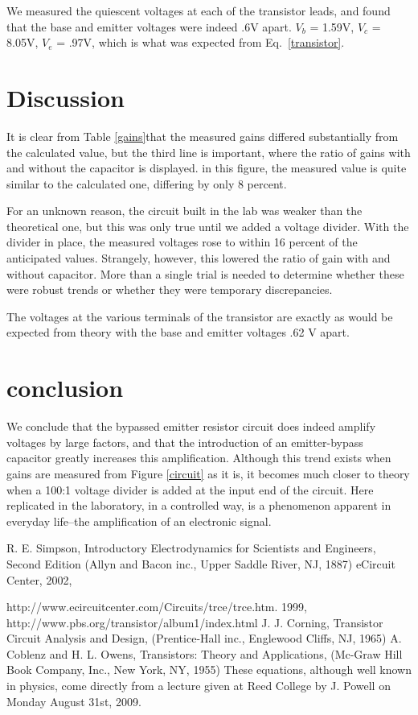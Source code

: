\documentclass[aps,pre,twocolumn,nofootinbib]{revtex4}
\begin{document}
We measured the quiescent voltages at each of the transistor leads, and found that the base and emitter voltages were indeed .6V apart.  $V_b$ = 1.59V, $V_c$ = 8.05V, $V_e$ = .97V, which is what was expected from Eq.~\ref{transistor}.

\section{Discussion}

It is clear from Table \ref{gains}that the measured gains differed substantially from the calculated value, but the third line is important, where the ratio of gains with and without the capacitor is displayed.  in this figure, the measured value is quite similar to the calculated one, differing by only 8 percent.  

For an unknown reason, the circuit built in the lab was weaker than the theoretical one, but this was only true until we added a voltage divider.  With the divider in place, the measured voltages rose to within 16 percent of the anticipated values.  Strangely, however, this lowered the ratio of gain with and without capacitor.  More than a single trial is needed to determine whether these were robust trends or whether they were temporary discrepancies.  

The voltages at the various terminals of the transistor are exactly as would be expected from theory with the base and emitter voltages .62 V apart.  

\section{conclusion}  
We conclude that the bypassed emitter resistor circuit does indeed amplify voltages by large factors, and that the introduction of an emitter-bypass capacitor greatly increases this amplification.  Although this trend exists when gains are measured from Figure \ref{circuit} as it is, it becomes much closer to theory when a 100:1 voltage divider is added at the input end of the circuit.  Here replicated in the laboratory, in a controlled way, is a phenomenon apparent in everyday life--the amplification of an electronic signal.  

	\begin{thebibliography}{99,onecolumn}
 R. E. Simpson, Introductory Electrodynamics for Scientists and Engineers, Second Edition (Allyn and Bacon inc., Upper Saddle River, NJ, 1887)
 eCircuit Center, 2002, 

http://www.ecircuitcenter.com/Circuits/trce/trce.htm.
 1999, http://www.pbs.org/transistor/album1/index.html
 J. J. Corning, Transistor Circuit Analysis and Design, (Prentice-Hall 
inc., Englewood Cliffs, NJ, 1965)
 A. Coblenz and H. L. Owens, Transistors: Theory and Applications, (Mc-Graw Hill Book Company, Inc., New York, NY, 1955)
 These equations, although well known in physics, come directly from a lecture given at Reed College by J. Powell on Monday August 31st, 2009.   

	\end{thebibliography}
\end{document}
